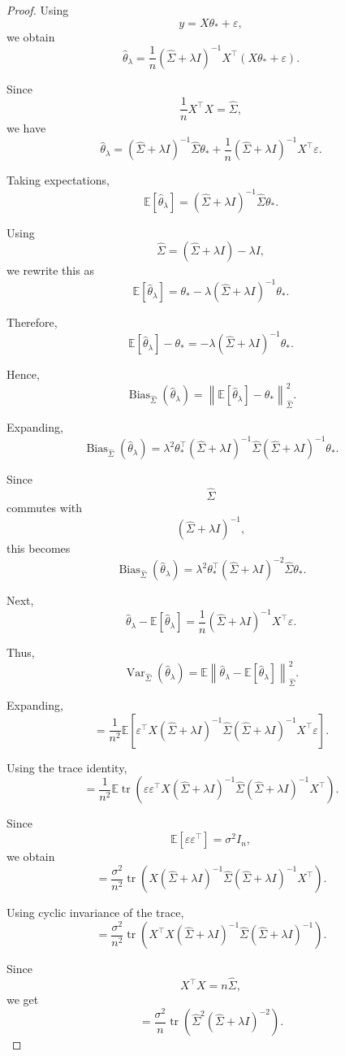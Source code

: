 \documentclass[12pt,oneside]{book}
\numberwithin{equation}{section}
\theoremstyle{definition}
\theoremstyle{plain}
\theoremstyle{remark}
\newcommand{\E}{\mathbb{E}}
\newcommand{\norm}[1]{\left\lVert #1 \right\rVert}
\newcommand{\tr}{\operatorname{tr}}
\begin{document}
\begin{proof}
Using
\[
y=X\theta_*+\varepsilon,
\]
we obtain
\[
\widehat{\theta}_\lambda
=
\frac{1}{n}
(\widehat{\Sigma}+\lambda I)^{-1}
X^\top(X\theta_*+\varepsilon).
\]

Since
\[
\frac{1}{n}X^\top X
=
\widehat{\Sigma},
\]
we have
\[
\widehat{\theta}_\lambda
=
(\widehat{\Sigma}+\lambda I)^{-1}
\widehat{\Sigma}\theta_*
+
\frac{1}{n}
(\widehat{\Sigma}+\lambda I)^{-1}
X^\top\varepsilon.
\]

Taking expectations,
\[
\E[\widehat{\theta}_\lambda]
=
(\widehat{\Sigma}+\lambda I)^{-1}
\widehat{\Sigma}\theta_*.
\]

Using
\[
\widehat{\Sigma}
=
(\widehat{\Sigma}+\lambda I)-\lambda I,
\]
we rewrite this as
\[
\E[\widehat{\theta}_\lambda]
=
\theta_*
-
\lambda
(\widehat{\Sigma}+\lambda I)^{-1}\theta_*.
\]

Therefore,
\[
\E[\widehat{\theta}_\lambda]-\theta_*
=
-
\lambda
(\widehat{\Sigma}+\lambda I)^{-1}\theta_*.
\]

Hence,
\[
\operatorname{Bias}_{\widehat{\Sigma}}(\widehat{\theta}_\lambda)
=
\norm{
\E[\widehat{\theta}_\lambda]-\theta_*
}_{\widehat{\Sigma}}^2.
\]

Expanding,
\[
\operatorname{Bias}_{\widehat{\Sigma}}(\widehat{\theta}_\lambda)
=
\lambda^2
\theta_*^\top
(\widehat{\Sigma}+\lambda I)^{-1}
\widehat{\Sigma}
(\widehat{\Sigma}+\lambda I)^{-1}
\theta_*.
\]

Since
\[
\widehat{\Sigma}
\]
commutes with
\[
(\widehat{\Sigma}+\lambda I)^{-1},
\]
this becomes
\[
\operatorname{Bias}_{\widehat{\Sigma}}(\widehat{\theta}_\lambda)
=
\lambda^2
\theta_*^\top
(\widehat{\Sigma}+\lambda I)^{-2}
\widehat{\Sigma}
\theta_*.
\]

Next,
\[
\widehat{\theta}_\lambda-\E[\widehat{\theta}_\lambda]
=
\frac{1}{n}
(\widehat{\Sigma}+\lambda I)^{-1}
X^\top\varepsilon.
\]

Thus,
\[
\operatorname{Var}_{\widehat{\Sigma}}(\widehat{\theta}_\lambda)
=
\E
\norm{
\widehat{\theta}_\lambda-\E[\widehat{\theta}_\lambda]
}_{\widehat{\Sigma}}^2.
\]

Expanding,
\[
=
\frac{1}{n^2}
\E\left[
\varepsilon^\top
X
(\widehat{\Sigma}+\lambda I)^{-1}
\widehat{\Sigma}
(\widehat{\Sigma}+\lambda I)^{-1}
X^\top
\varepsilon
\right].
\]

Using the trace identity,
\[
=
\frac{1}{n^2}
\E
\tr\left(
\varepsilon\varepsilon^\top
X
(\widehat{\Sigma}+\lambda I)^{-1}
\widehat{\Sigma}
(\widehat{\Sigma}+\lambda I)^{-1}
X^\top
\right).
\]

Since
\[
\E[\varepsilon\varepsilon^\top]
=
\sigma^2I_n,
\]
we obtain
\[
=
\frac{\sigma^2}{n^2}
\tr\left(
X
(\widehat{\Sigma}+\lambda I)^{-1}
\widehat{\Sigma}
(\widehat{\Sigma}+\lambda I)^{-1}
X^\top
\right).
\]

Using cyclic invariance of the trace,
\[
=
\frac{\sigma^2}{n^2}
\tr\left(
X^\top X
(\widehat{\Sigma}+\lambda I)^{-1}
\widehat{\Sigma}
(\widehat{\Sigma}+\lambda I)^{-1}
\right).
\]

Since
\[
X^\top X=n\widehat{\Sigma},
\]
we get
\[
=
\frac{\sigma^2}{n}
\tr\left(
\widehat{\Sigma}^2
(\widehat{\Sigma}+\lambda I)^{-2}
\right).
\]
\end{proof}
\end{document}
